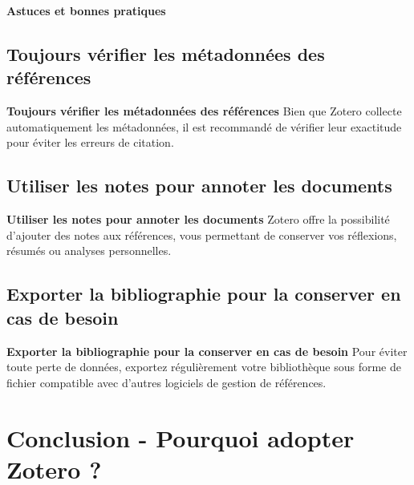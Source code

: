 \documentclass{beamer}
\begin{document}
\begin{frame}{\textbf{Astuces et bonnes pratiques}}


\subsection{Toujours vérifier les métadonnées des références}

\begin{block}{\textbf{Toujours vérifier les métadonnées des références}}
Bien que Zotero collecte automatiquement les métadonnées, il est recommandé de vérifier leur exactitude pour éviter les erreurs de citation.
\end{block}


\subsection{Utiliser les notes pour annoter les documents}

\begin{block}{\textbf{Utiliser les notes pour annoter les documents}}
Zotero offre la possibilité d’ajouter des notes aux références, vous permettant de conserver vos réflexions, résumés ou analyses personnelles.
\end{block}

\subsection{Exporter la bibliographie pour la conserver en cas de besoin}

\begin{block}{\textbf{Exporter la bibliographie pour la conserver en cas de besoin}}
Pour éviter toute perte de données, exportez régulièrement votre bibliothèque sous forme de fichier compatible avec d'autres logiciels de gestion de références.
\end{block}

\end{frame}

\section{Conclusion - Pourquoi adopter Zotero ?}
\end{document}

